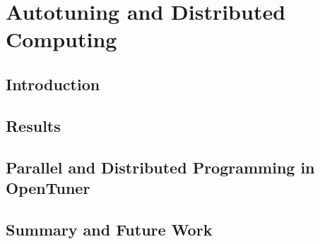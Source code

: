 \section{Autotuning and Distributed Computing}
\label{sec:autotuningCloud}

\subsection{Introduction}
\label{subsec:CLintro}

\subsection{Results}
\label{subsec:CLres}

\subsection{Parallel and Distributed Programming in OpenTuner}
\label{subsec:parallel}

\subsection{Summary and Future Work}
\label{subsec:CLconcl}

